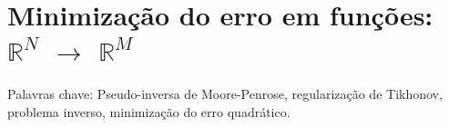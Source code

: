 
\chapter{Minimização do erro em funções: $\mathbb{R}^{N}$ $\rightarrow$ $\mathbb{R}^{M}$}

\begin{remark}
Palavras chave: 
Pseudo-inversa de Moore-Penrose,
regularização de Tikhonov,
problema inverso, 
minimização do erro quadrático. 
\end{remark}


\newpage


\newpage


\newpage


\newpage


\newpage



\begin{comment}
\section{Minimização de $\frac{||\VECTOR{f}(\VECTOR{x})-\VECTOR{b}||^2}{||\VECTOR{b}||^2}$
$+\alpha\frac{||\VECTOR{x}-\VECTOR{q}||^2}{||\VECTOR{q}||^2}$  
}
\textcolor{red}{Inventado por mi ..., creo.}
\section{Minimização de $||\VECTOR{f}(\VECTOR{x})-\VECTOR{b}||_{\MATRIX{B}^{-2}}^2$
$+\alpha||\VECTOR{x}-\VECTOR{q}||_{\MATRIX{Q}^{-2}}^2$  
}
\textcolor{red}{Inventado por mi ..., creo Nenhun valor de $\VECTOR{b}$ ou $\VECTOR{q}$ pode ser zero.}
\end{comment}

